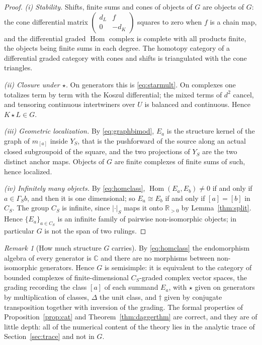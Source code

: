 \documentclass[11pt]{amsart}
\theoremstyle{definition}
\theoremstyle{remark}
\newtheorem{remark}[theorem]{Remark}
\newcommand{\C}{\mathbb C}
\newcommand{\R}{\mathbb R}
\newcommand{\Hom}{\operatorname{Hom}}
\begin{document}
\begin{proof}
\emph{(i) Stability.}  Shifts, finite sums and cones of objects of $G$ are
objects of $G$: the cone differential matrix
$\left(\begin{smallmatrix}d_L&f\\0&-d_K\end{smallmatrix}\right)$ squares to
zero when $f$ is a chain map, and the differential graded $\Hom$ complex is
complete with all products finite, the objects being finite sums in each
degree.  The homotopy category of a differential graded category with cones
and shifts is triangulated with the cone triangles.

\emph{(ii) Closure under $\star$.}  On generators this is \eqref{eq:starmult}.
On complexes one totalizes term by term with the Koszul differential; the mixed
terms of $d^{2}$ cancel, and tensoring continuous intertwiners over $U$ is
balanced and continuous.  Hence $K\star L\in G$.

\emph{(iii) Geometric localization.}  By \eqref{eq:graphbimod}, $E_a$ is the
structure kernel of the graph of $m_{[a]}$ inside $Y_S$, that is the
pushforward of the source along an actual closed subgroupoid of the square,
and the two projections of $Y_S$ are the two distinct anchor maps.  Objects of
$G$ are finite complexes of finite sums of such, hence localized.

\emph{(iv) Infinitely many objects.}  By \eqref{eq:homclass},
$\Hom(E_a,E_b)\ne0$ if and only if $a\in\Gamma_S b$, and then it is one
dimensional; so $E_a\cong E_b$ if and only if $[a]=[b]$ in $C_S$.  The group
$C_S$ is infinite, since $|\cdot|_S$ maps it onto $\R_{>0}$ by
Lemma~\ref{thm:split}.  Hence $\{E_a\}_{a\in C_S}$ is an infinite family of
pairwise non-isomorphic objects; in particular $G$ is not the span of two
rulings.
\end{proof}

\begin{remark}[How much structure $G$ carries]\label{rem:semisimple}
By \eqref{eq:homclass} the endomorphism algebra of every generator is $\C$
and there are no morphisms between non-isomorphic generators.  Hence $G$ is
semisimple: it is equivalent to the category of bounded complexes of
finite-dimensional $C_S$-graded complex vector spaces, the grading recording
the class $[a]$ of each summand $E_a$, with $\star$ given on generators by
multiplication of classes, $\Delta$ the unit class, and $\dagger$ given by
conjugate transposition together with inversion of the grading.  The formal
properties of Proposition~\ref{prop:cat} and Theorem~\ref{thm:daggerthm} are
correct, and they are of little depth: all of the numerical content of the
theory lies in the analytic trace of Section~\ref{sec:trace} and not in $G$.
\end{remark}
\end{document}
